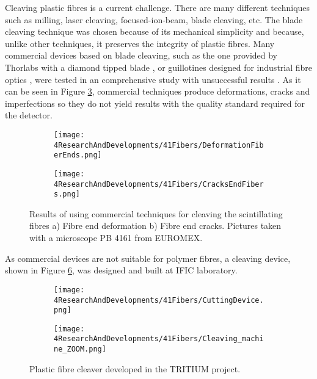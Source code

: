 Cleaving plastic fibres is a current challenge. There are many different techniques such as milling, laser cleaving, focused-ion-beam, blade cleaving, etc. The blade cleaving technique was chosen because of its mechanical simplicity and because, unlike other techniques, it preserves the integrity of plastic fibres. Many commercial devices based on blade cleaving, such as the one provided by Thorlabs with a diamond tipped blade \cite{DiamondThorlabs}, or guillotines designed for industrial fibre optics \cite{GuillotineIFO}, were tested in an comprehensive study with unsuccessful results \cite{TFGAlberto}. As it can be seen in Figure \ref{fig:BadCleavesOfFibers}, commercial techniques produce deformations, cracks and imperfections so they do not yield results with the quality standard required for the detector.
\begin{figure}
\centering
    \begin{subfigure}[b]{0.5\textwidth}
    \centering
    \texttt{[image: 4ResearchAndDevelopments/41Fibers/DeformationFiberEnds.png]}  
    \caption{\label{subfig:FiberEndDeformation}}
    \end{subfigure}
    \hfill
    \begin{subfigure}[b]{0.45\textwidth}
    \centering
    \texttt{[image: 4ResearchAndDevelopments/41Fibers/CracksEndFibers.png]}  
    \caption{\label{subfig:FiberEndCracks}}
    \end{subfigure}
 \caption{Results of using commercial techniques for cleaving the scintillating fibres a) Fibre end deformation b) Fibre end cracks. Pictures taken with a microscope PB 4161 from EUROMEX.}
 \label{fig:BadCleavesOfFibers}
\end{figure}
As commercial devices are not suitable for polymer fibres, a cleaving device, shown in Figure \ref{fig:CleaveTRITIUMDevice}, was designed and built at IFIC laboratory.
\begin{figure}
\centering
    \begin{subfigure}[b]{0.5\textwidth}
    \centering
    \texttt{[image: 4ResearchAndDevelopments/41Fibers/CuttingDevice.png]}  
    \caption{\label{subfig:CleaveTRITIUMDevice1}}
    \end{subfigure}
    \hfill
    \begin{subfigure}[b]{0.45\textwidth}
    \centering
    \texttt{[image: 4ResearchAndDevelopments/41Fibers/Cleaving\_machine\_ZOOM.png]}  
    \caption{\label{subfig:CleaveTRITIUMDeviceZOOM}}
    \end{subfigure}
 \caption{Plastic fibre cleaver developed in the TRITIUM project. \label{fig:CleaveTRITIUMDevice}}
\end{figure}
